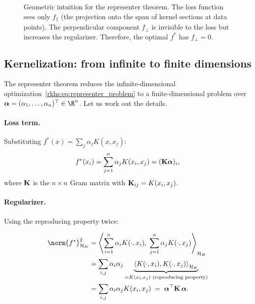 \begin{notechapter}
\begin{figure}[ht]
\caption{Geometric intuition for the representer theorem. The loss
function sees only $f_\parallel$ (the projection onto the span of kernel
sections at data points). The perpendicular component $f_\perp$ is
invisible to the loss but increases the regularizer. Therefore, the
optimal $f^*$ has $f_\perp = 0$.}
\label{rkhs:fig:representer}
\end{figure}

\subsection{Kernelization: from infinite to finite dimensions}

The representer theorem reduces the infinite-dimensional
optimization~\eqref{rkhs:eq:representer_problem} to a finite-dimensional
problem over $\vect{\alpha} = (\alpha_1, \ldots, \alpha_n)^\top \in
\R^n$. Let us work out the details.

\paragraph{Loss term.} Substituting $f^*(x) = \sum_j \alpha_j K(x, x_j)$:
\[
f^*(x_i) = \sum_{j=1}^n \alpha_j K(x_i, x_j) = (\mathbf{K}\boldsymbol{\alpha})_i,
\]
where $\mathbf{K}$ is the $n \times n$ Gram matrix with $\mathbf{K}_{ij} =
K(x_i, x_j)$.

\paragraph{Regularizer.} Using the reproducing property twice:

\begin{align*}
\norm{f^*}_{\hk}^2 &=
\left\langle \sum_{i=1}^n \alpha_i K(\cdot, x_i),\;
\sum_{j=1}^n \alpha_j K(\cdot, x_j) \right\rangle_{\hk} \nonumber \\
&= \sum_{i,j} \alpha_i \alpha_j
\underbrace{\left\langle K(\cdot, x_i), K(\cdot, x_j)
\right\rangle_{\hk}}_{= K(x_i, x_j)
\text{ (reproducing property)}} \nonumber \\
&= \sum_{i,j} \alpha_i \alpha_j K(x_i, x_j) \;=\;
\vect{\alpha}^\top \mat{K}\, \vect{\alpha}. \label{rkhs:eq:rkhs_norm_alpha}
\end{align*}


\end{notechapter}
